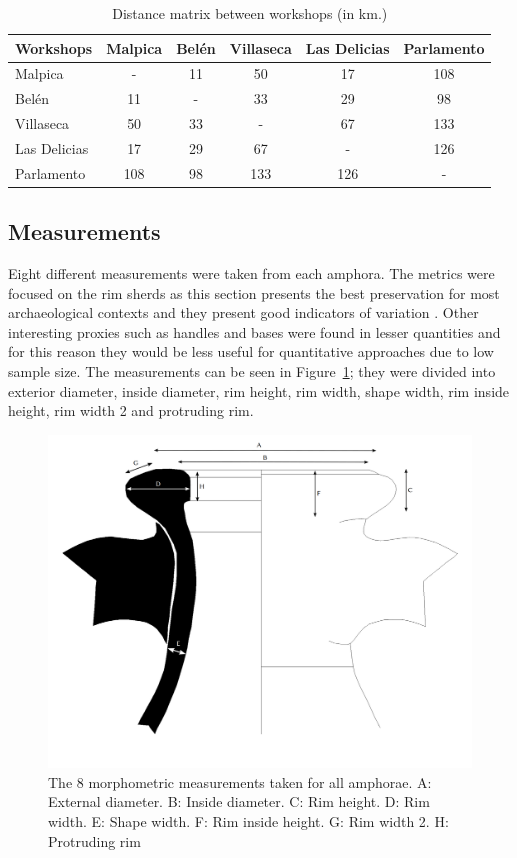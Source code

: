 \documentclass[review]{elsarticle}
\begin{document}
\begin{table}[htp]
\centering

\begin{tabular}{lccccc}
\hline

\textbf{Workshops} & Malpica & Belén & Villaseca & Las Delicias & Parlamento \\ \hline
Malpica & - & 11 & 50 & 17 & 108 \\
Belén & 11 & - & 33 & 29 & 98 \\
Villaseca & 50 & 33 & - & 67 & 133 \\
Las Delicias & 17 & 29 & 67 & - & 126 \\
Parlamento & 108 & 98 & 133 & 126 & - \\
\hline
\end{tabular}
\caption{Distance matrix between workshops (in km.)}
\label{table:distances}
\end{table}

\subsection{Measurements}

Eight different measurements were taken from each amphora. The metrics were focused on the rim sherds as this section presents the best preservation for most archaeological contexts and they present good indicators of variation \citep{berni_millet_epigrafianforica_2008}. Other interesting proxies such as handles and bases were found in lesser quantities and for this reason they would be less useful for quantitative approaches due to low sample size. The measurements can be seen in Figure~\ref{mesures}; they were divided into exterior diameter, inside diameter, rim height, rim width, shape width, rim inside height, rim width 2 and protruding rim.

\begin{figure}[htp]
	\centering
\includegraphics[width=\linewidth]{figs/mesures.png}
\caption{The 8 morphometric measurements taken for all amphorae. A: External diameter. B: Inside diameter. C: Rim height. D: Rim width. E: Shape width. F: Rim inside height. G: Rim width 2. H: Protruding rim}
\label{mesures}
\end{figure} 
\end{document}
